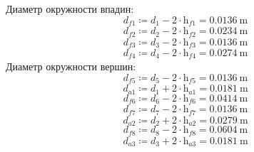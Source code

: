 \documentclass{article}
\newcommand{\defeq}{\coloneq} %
\begin{document}
\colorbox[HTML]{000000}{Диаметр окружности впадин:}\newline
\begin{equation*}
\textit{d}_{\textit{f1}} \defeq \textit{d}_{\textit{1}}-2 \cdot \textit{h}_{\textit{f1}} = {0.0136 \: \mathrm{m}}
\end{equation*}
\begin{equation*}
\textit{d}_{\textit{f2}} \defeq \textit{d}_{\textit{2}}-2 \cdot \textit{h}_{\textit{f2}} = {0.0234 \: \mathrm{m}}
\end{equation*}
\begin{equation*}
\textit{d}_{\textit{f3}} \defeq \textit{d}_{\textit{3}}-2 \cdot \textit{h}_{\textit{f3}} = {0.0136 \: \mathrm{m}}
\end{equation*}
\begin{equation*}
\textit{d}_{\textit{f4}} \defeq \textit{d}_{\textit{4}}-2 \cdot \textit{h}_{\textit{f4}} = {0.0274 \: \mathrm{m}}
\end{equation*}
\colorbox[HTML]{000000}{Диаметр окружности вершин:}\newline
\begin{equation*}
\textit{d}_{\textit{f5}} \defeq \textit{d}_{\textit{5}}-2 \cdot \textit{h}_{\textit{f5}} = {0.0136 \: \mathrm{m}}
\end{equation*}
\begin{equation*}
\textit{d}_{\textit{a1}} \defeq \textit{d}_{\textit{1}}+2 \cdot \textit{h}_{\textit{a1}} = {0.0181 \: \mathrm{m}}
\end{equation*}
\begin{equation*}
\textit{d}_{\textit{f6}} \defeq \textit{d}_{\textit{6}}-2 \cdot \textit{h}_{\textit{f6}} = {0.0414 \: \mathrm{m}}
\end{equation*}
\begin{equation*}
\textit{d}_{\textit{f7}} \defeq \textit{d}_{\textit{7}}-2 \cdot \textit{h}_{\textit{f7}} = {0.0136 \: \mathrm{m}}
\end{equation*}
\begin{equation*}
\textit{d}_{\textit{a2}} \defeq \textit{d}_{\textit{2}}+2 \cdot \textit{h}_{\textit{a2}} = {0.0279 \: \mathrm{m}}
\end{equation*}
\begin{equation*}
\textit{d}_{\textit{f8}} \defeq \textit{d}_{\textit{8}}-2 \cdot \textit{h}_{\textit{f8}} = {0.0604 \: \mathrm{m}}
\end{equation*}
\begin{equation*}
\textit{d}_{\textit{a3}} \defeq \textit{d}_{\textit{3}}+2 \cdot \textit{h}_{\textit{a3}} = {0.0181 \: \mathrm{m}}
\end{equation*}
\end{document}
